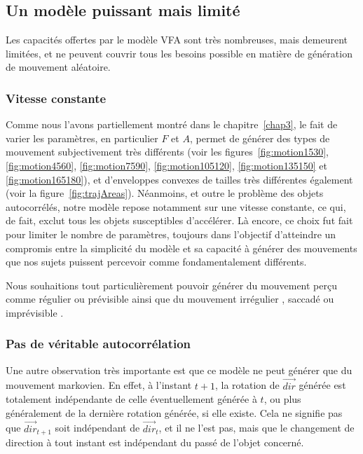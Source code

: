    \subsection{Un modèle puissant mais limité}
	Les capacités offertes par le modèle VFA sont très nombreuses, mais demeurent limitées, et ne peuvent couvrir tous les besoins possible en matière de génération de mouvement aléatoire.
    
    \subsubsection{Vitesse constante}
    Comme nous l'avons partiellement montré dans le chapitre~\ref{chap3}, le fait de varier les paramètres, en particulier $F$ et $A$, permet de générer des types de mouvement subjectivement très différents (voir les figures~\ref{fig:motion1530}, \ref{fig:motion4560}, \ref{fig:motion7590}, \ref{fig:motion105120}, \ref{fig:motion135150} et \ref{fig:motion165180}), et d'enveloppes convexes de tailles très différentes également (voir la figure~\ref{fig:trajAreas}). Néanmoins, et outre le problème des objets autocorrélés, notre modèle repose notamment sur une vitesse constante, ce qui, de fait, exclut tous les objets susceptibles d'accélérer. Là encore, ce choix fut fait pour limiter le nombre de paramètres, toujours dans l'objectif d'atteindre un compromis entre la simplicité du modèle et sa capacité à générer des mouvements que nos sujets puissent percevoir comme fondamentalement différents.
    
	Nous souhaitions tout particulièrement pouvoir générer du mouvement perçu comme \og régulier \fg{} ou \og prévisible \fg{} ainsi que du mouvement \og irrégulier \fg{}, \og saccadé \fg{} ou \og imprévisible \fg{}.
    
   	\subsubsection{Pas de véritable autocorrélation}
	Une autre observation très importante est que ce modèle ne peut générer que du mouvement markovien. En effet, à l'instant $t+1$, la rotation de $\vec{dir}$ générée est totalement indépendante de celle éventuellement générée à $t$, ou plus généralement de la dernière rotation générée, si elle existe. Cela ne signifie pas que $\vec{dir}_{t+1}$ soit indépendant de $\vec{dir}_{t}$, et il ne l'est pas, mais que le changement de direction à tout instant est indépendant du passé de l'objet concerné.
    
